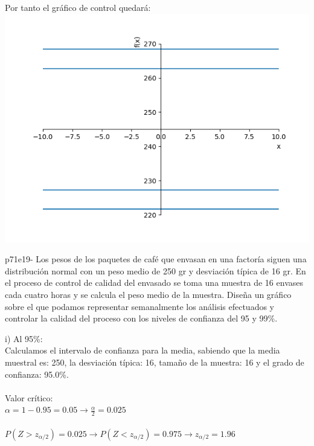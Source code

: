\documentclass[spanish, 11pt]{exam}
\begin{document}
\begin{questions}
\begin{solution}
    Por tanto el gráfico de control quedará: \\ \includegraphics[scale=0.6]{p71e18.png}   \end{solution}\question p71e19- Los pesos de los paquetes de café que envasan en una factoría siguen una distribución normal con un peso
medio de 250 gr y desviación típica de 16 gr. En el proceso de control de calidad del envasado se toma una
muestra de 16 envases cada cuatro horas y se calcula el peso medio de la muestra. Diseña un gráfico sobre el
que podamos representar semanalmente los análisis efectuados y controlar la calidad del proceso con los
niveles de confianza del 95 y 99\%. \begin{solution}   i) Al 95\%: \\  Calculamos el intervalo de confianza para la media, sabiendo que la media muestral es: 250, la desviación típica: 16, tamaño de la muestra: 16 y el grado de confianza: 95.0\%. \\ \\ Valor crítico: \\ $\alpha=1-0.95=0.05\to \frac{\alpha}{2}=0.025$ \\ \\ $P(Z>z_{\alpha/2})=0.025\to P(Z<z_{\alpha/2})=0.975 \to z_{\alpha/2} =1.96$ \\ 
\end{solution}
\end{questions}
\end{document}
